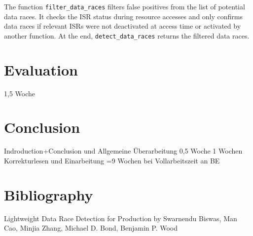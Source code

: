\documentclass[
fancyheadings, %
%
%
]{stsreprt}
\begin{document}
{\begin{algorithm}[H]
{{			
		}
		\;
	}
	
	
\end{algorithm}

The function \texttt{filter\_data\_races} filters false positives from the list of potential data races. It checks the ISR status during resource accesses and only confirms data races if relevant ISRs were not deactivated at access time or activated by another function. At the end, \texttt{detect\_data\_races} returns the filtered data races.


\chapter{Evaluation}
1,5 Woche 
\chapter{Conclusion}
Indroduction+Conclusion und Allgemeine Überarbeitung 0,5 Woche
1 Wochen Korrekturlesen und Einarbeitung
=9 Wochen bei Vollarbeitszeit an BE
\appendix
}
\backmatter{}
\chapter{Bibliography}
Lightweight Data Race Detection for Production by Swarnendu Biswas, Man Cao, Minjia Zhang, Michael D. Bond, Benjamin P. Wood
\end{document}
